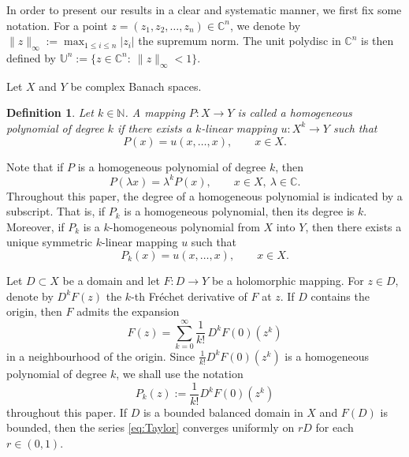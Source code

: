 \documentclass[11pt, reqno]{amsart}
\newtheorem*{theoE}{Theorem E}
\newtheorem*{cor A}{Corollary A}
\newtheorem*{cor B}{Corollary B}
\newtheorem{defi}{Definition}[section]
\numberwithin{equation}{section}
\begin{document}
In order to present our results in a clear and systematic manner, we first fix some
notation. For a point $z=(z_1,z_2,\ldots,z_n)\in\mathbb{C}^n$, we denote by $\|z\|_\infty:=\max_{1\le i\le n}|z_i|$
the supremum norm. The unit polydisc in $\mathbb{C}^n$ is then defined by
$\mathbb{U}^n:=\{z\in\mathbb{C}^n:\ \|z\|_\infty<1\}.$\par
Let $X$ and $Y$ be complex Banach spaces.
\begin{defi}
Let $k\in\mathbb{N}$. A mapping $P\colon X\to Y$ is called a \emph{homogeneous polynomial of degree $k$}
if there exists a $k$-linear mapping $u\colon X^k\to Y$ such that
\[
P(x)=u(x,\ldots,x), \qquad x\in X.
\]
\end{defi}

Note that if $P$ is a homogeneous polynomial of degree $k$, then
\[
P(\lambda x)=\lambda^k P(x), \qquad x\in X,\ \lambda\in\mathbb{C}.
\]
Throughout this paper, the degree of a homogeneous polynomial is indicated by a subscript.
That is, if $P_k$ is a homogeneous polynomial, then its degree is $k$.
Moreover, if $P_k$ is a $k$-homogeneous polynomial from $X$ into $Y$, then there exists a unique
symmetric $k$-linear mapping $u$ such that
\[
P_k(x)=u(x,\ldots,x), \qquad x\in X.
\]

Let $D\subset X$ be a domain and let $F\colon D\to Y$ be a holomorphic mapping.
For $z\in D$, denote by $D^kF(z)$ the $k$-th Fr\'{e}chet derivative of $F$ at $z$.
If $D$ contains the origin, then $F$ admits the expansion
\begin{equation}
F(z)=\sum_{k=0}^{\infty}\frac{1}{k!}\,D^kF(0)(z^k)
\label{eq:Taylor}
\end{equation}
in a neighbourhood of the origin.
Since $\frac{1}{k!}D^kF(0)(z^k)$ is a homogeneous polynomial of degree $k$, we shall use the notation
\[
P_k(z):=\frac{1}{k!}D^kF(0)(z^k)
\]
throughout this paper.
If $D$ is a bounded balanced domain in $X$ and $F(D)$ is bounded, then the series
\eqref{eq:Taylor} converges uniformly on $rD$ for each $r\in(0,1)$.
\end{document}
